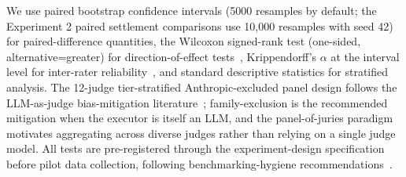 We use paired bootstrap confidence intervals (5000 resamples by default; the Experiment 2 paired settlement comparisons use 10,000 resamples with seed 42) for paired-difference quantities, the Wilcoxon signed-rank test (one-sided, alternative=greater) for direction-of-effect tests~\cite{wilcoxon1945}, Krippendorff's $\alpha$ at the interval level for inter-rater reliability~\cite{krippendorff2011alpha, hayes2007standard}, and standard descriptive statistics for stratified analysis. The 12-judge tier-stratified Anthropic-excluded panel design follows the LLM-as-judge bias-mitigation literature~\cite{zheng2023mtbench, panickssery2024selfpref, stureborg2024inconsistent}; family-exclusion is the recommended mitigation when the executor is itself an LLM, and the panel-of-juries paradigm~\cite{verga2024juries} motivates aggregating across diverse judges rather than relying on a single judge model. All tests are pre-registered through the experiment-design specification before pilot data collection, following benchmarking-hygiene recommendations~\cite{bowman2022benchmarking}.
